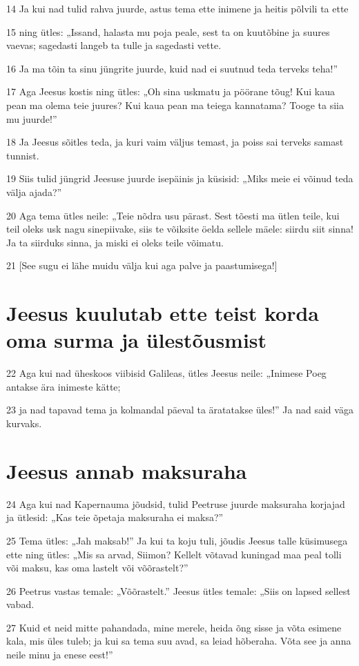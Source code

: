 \par 14 Ja kui nad tulid rahva juurde, astus tema ette inimene ja heitis põlvili ta ette
\par 15 ning ütles: „Issand, halasta mu poja peale, sest ta on kuutõbine ja suures vaevas; sagedasti langeb ta tulle ja sagedasti vette.
\par 16 Ja ma tõin ta sinu jüngrite juurde, kuid nad ei suutnud teda terveks teha!”
\par 17 Aga Jeesus kostis ning ütles: „Oh sina uskmatu ja pöörane tõug! Kui kaua pean ma olema teie juures? Kui kaua pean ma teiega kannatama? Tooge ta siia mu juurde!”
\par 18 Ja Jeesus sõitles teda, ja kuri vaim väljus temast, ja poiss sai terveks samast tunnist.
\par 19 Siis tulid jüngrid Jeesuse juurde isepäinis ja küsisid: „Miks meie ei võinud teda välja ajada?”
\par 20 Aga tema ütles neile: „Teie nõdra usu pärast. Sest tõesti ma ütlen teile, kui teil oleks usk nagu sinepiivake, siis te võiksite öelda sellele mäele: siirdu siit sinna! Ja ta siirduks sinna, ja miski ei oleks teile võimatu.
\par 21 [See sugu ei lähe muidu välja kui aga palve ja paastumisega!]

\section*{Jeesus kuulutab ette teist korda oma surma ja ülestõusmist}

\par 22 Aga kui nad üheskoos viibisid Galileas, ütles Jeesus neile: „Inimese Poeg antakse ära inimeste kätte;
\par 23 ja nad tapavad tema ja kolmandal päeval ta äratatakse üles!” Ja nad said väga kurvaks.

\section*{Jeesus annab maksuraha}

\par 24 Aga kui nad Kapernauma jõudsid, tulid Peetruse juurde maksuraha korjajad ja ütlesid: „Kas teie õpetaja maksuraha ei maksa?”
\par 25 Tema ütles: „Jah maksab!” Ja kui ta koju tuli, jõudis Jeesus talle küsimusega ette ning ütles: „Mis sa arvad, Siimon? Kellelt võtavad kuningad maa peal tolli või maksu, kas oma lastelt või võõrastelt?”
\par 26 Peetrus vastas temale: „Võõrastelt.” Jeesus ütles temale: „Siis on lapsed sellest vabad.
\par 27 Kuid et neid mitte pahandada, mine merele, heida õng sisse ja võta esimene kala, mis üles tuleb; ja kui sa tema suu avad, sa leiad hõberaha. Võta see ja anna neile minu ja enese eest!”


